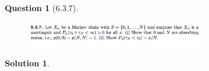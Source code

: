 \documentclass{article} %
\theoremstyle{quest}
\newtheorem*{question}{Question}
\newtheorem*{solution}{Solution}
\begin{document}
\newpage


\begin{question}[6.3.7]
\hfill
\begin{figure}[h!]
  \centering
    \includegraphics[width=0.7\textwidth]{d-6-3-7.png}
\end{figure}
\end{question}
\begin{solution} \hfill \\
\end{solution}



\bigskip
\end{document}
